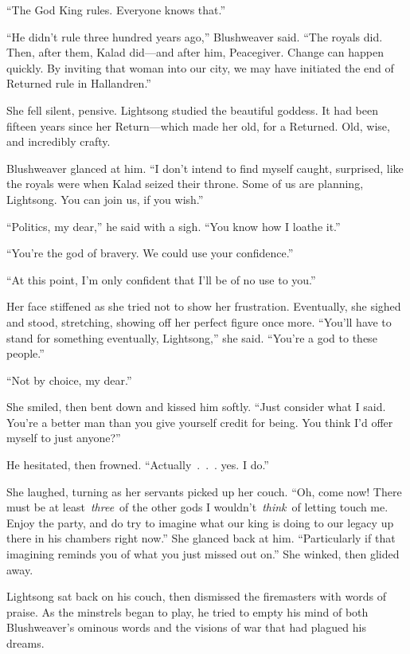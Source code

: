 “The God King rules. Everyone knows that.”

“He didn’t rule three hundred years ago,” Blushweaver said. “The royals did. Then, after them, Kalad did—and after him, Peacegiver. Change can happen quickly. By inviting that woman into our city, we may have initiated the end of Returned rule in Hallandren.”

She fell silent, pensive. Lightsong studied the beautiful goddess. It had been fifteen years since her Return—which made her old, for a Returned. Old, wise, and incredibly crafty.

Blushweaver glanced at him. “I don’t intend to find myself caught, surprised, like the royals were when Kalad seized their throne. Some of us are planning, Lightsong. You can join us, if you wish.”

“Politics, my dear,” he said with a sigh. “You know how I loathe it.”

“You’re the god of bravery. We could use your confidence.”

“At this point, I’m only confident that I’ll be of no use to you.”

Her face stiffened as she tried not to show her frustration. Eventually, she sighed and stood, stretching, showing off her perfect figure once more. “You’ll have to stand for something eventually, Lightsong,” she said. “You’re a god to these people.”

“Not by choice, my dear.”

She smiled, then bent down and kissed him softly. “Just consider what I said. You’re a better man than you give yourself credit for being. You think I’d offer myself to just anyone?”

He hesitated, then frowned. “Actually~.~.~. yes. I do.”

She laughed, turning as her servants picked up her couch. “Oh, come now! There must be at least~\textit{three}~of the other gods I wouldn’t~\textit{think}~of letting touch me. Enjoy the party, and do try to imagine what our king is doing to our legacy up there in his chambers right now.” She glanced back at him. “Particularly if that imagining reminds you of what you just missed out on.” She winked, then glided away.

Lightsong sat back on his couch, then dismissed the firemasters with words of praise. As the minstrels began to play, he tried to empty his mind of both Blushweaver’s ominous words and the visions of war that had plagued his dreams.

